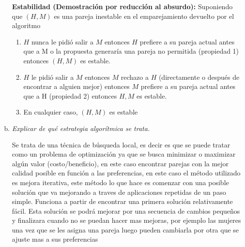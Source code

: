 \begin{enumerate}[a)]
  \textbf{Estabilidad (Demostración por reducción al absurdo): }Suponiendo que $(H,M)$ es una pareja inestable en el emparejamiento devuelto por el algoritmo
    \begin{enumerate}[1.]
      \item $H$ nunca le pidió salir a $M$ entonces $H$ prefiere a su pareja actual antes que a M o la propuesta generaría una pareja no permitida (propiedad 1) entonces $(H,M)$ es estable.
      \item $H$ le pidió salir a $M$ entonces $M$ rechazo a $H$ (directamente o después de encontrar a alguien mejor) entonces $M$ prefiere a su pareja actual antes que a H (propiedad 2) entonces $H,M$ es estable.
      \item En cualquier caso, $(H,M)$ es estable
    \end{enumerate}
  \item \textit{ Explicar de qué estrategia algorítmica se trata.}
  
  Se trata de una técnica de búsqueda local, es decir es que se puede tratar como un problema de optimización ya que se busca minimizar o maximizar algún valor (costo/beneficio), en este caso encontrar parejas con la mejor calidad posible en función a las preferencias, en este caso el método utilizado es mejora iterativa, este método lo que hace es comenzar con una posible solución que va mejorando a traves de aplicaciones repetidas de un paso simple. Funciona a partir de encontrar una primera solución relativamente fácil. Esta solución se podrá mejorar por una secuencia de cambios pequeños y finalizara cuando no se puedan hacer mas mejoras, por ejemplo las mujeres una vez que se les asigna una pareja luego pueden cambiarla por otra que se ajuste mas a sus preferencias
\end{enumerate}